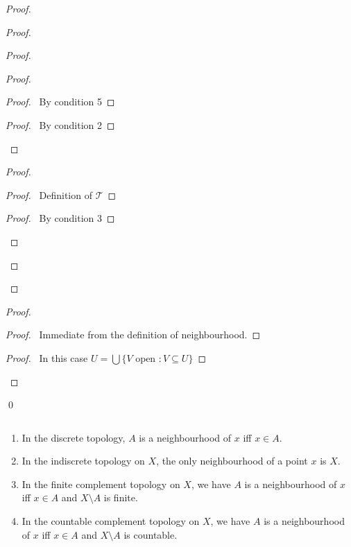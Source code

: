 \begin{proof}
\begin{proof}
    \begin{proof}
      \begin{proof}
        \begin{proof}
          \pf\ By condition 5
        \end{proof}
        \begin{proof}
          \pf\ By condition 2
        \end{proof}
      \end{proof}
      \begin{proof}
        \begin{proof}
          \pf\ Definition of $\mathcal{T}$
        \end{proof}
        \begin{proof}
          \pf\ By condition 3
        \end{proof}
      \end{proof}
    \end{proof}
  \end{proof}
  \begin{proof}
    \begin{proof}
      \pf\ Immediate from the definition of neighbourhood.
    \end{proof}
    \begin{proof}
      \pf\ In this case $U = \bigcup \{ V \text{ open } : V \subseteq U \}$
    \end{proof}
  \end{proof}
  \qed
\end{proof}

\begin{ex}$ $
  \begin{enumerate}
    \item
    In the discrete topology, $A$ is a neighbourhood of $x$ iff $x \in A$.
    \item
    In the indiscrete topology on $X$, the only neighbourhood of a point $x$ is $X$.
    \item
    In the finite complement topology on $X$, we have $A$ is a neighbourhood of $x$ iff $x \in A$ and $X \setminus A$ is finite.
    \item
    In the countable complement topology on $X$, we have $A$ is a neighbourhood of $x$ iff $x \in A$ and $X \setminus A$ is countable.
  \end{enumerate}
\end{ex}

